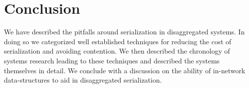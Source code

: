 \section{Conclusion}

We have described the pitfalls around serialization in disaggregated systems. In
doing so we categorized well established techniques for reducing the cost of
serialization and avoiding contention. We then described the chronology of
systems research leading to these techniques and described the systems
themselves in detail. We conclude with a discussion on the ability of in-network
data-structures to aid in disaggregated serialization.


    





    

